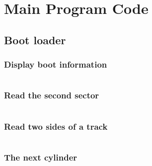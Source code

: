 \documentclass{swfcthesis}
\begin{document}
\appendix{}
\maketailpages{} %


\chapter{Main Program Code} %

\section{Boot loader}

\subsection{Display boot information}
\label{sec:dis-boo-inf}

\inputminted[firstline=55, lastline=65,
linenos=true]{nasm}{../../src/kernel/ipl10.asm}

\subsection{Read the second sector}
\label{sec:rea-sec-sec}
  
\inputminted[firstline=87,lastline=106,linenos=true]{nasm}{../../src/kernel/ipl10.asm}

\subsection{Read two sides of a track}
\label{sec:rea-two-sid}

\inputminted[firstline=108,lastline=132,linenos=true]{nasm}{../../src/kernel/ipl10.asm}

\subsection{The next cylinder}
\label{sec:the-nex-cyl}

\inputminted[firstline=134,lastline=137,linenos=true]{nasm}{../../src/kernel/ipl10.asm}
\end{document}
